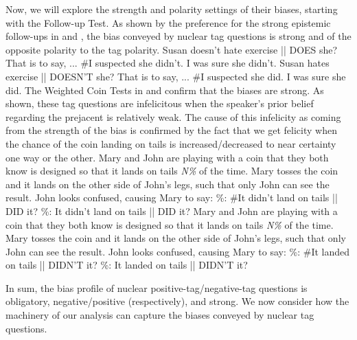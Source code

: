 \documentclass[output=paper,colorlinks,citecolor=brown]{langscibook}
\begin{document}
Now, we will explore the strength and polarity settings of their biases, starting with the Follow-up Test. As shown by the preference for the strong epistemic follow-ups in  and , the bias conveyed by nuclear tag questions is strong and of the opposite polarity to the tag polarity.
\is{}
\ea Susan doesn't hate exercise || DOES she? That is to say, ...\label{Pos.Nu.TIS}
    \ea \#I suspected she didn't.
    \ex I was sure she didn't.
    \z
\ex Susan hates exercise || DOESN'T she? That is to say, ...\label{Neg.Nu.TIS}
    \ea \#I suspected she did.
    \ex I was sure she did.
    \z
\z
{}
The Weighted Coin Tests in  and  confirm that the biases are strong. As shown, these tag questions are infelicitous when the speaker's prior belief regarding the prejacent is relatively weak. The cause of this infelicity as coming from the strength of the bias is confirmed by the fact that we get felicity when the chance of the coin landing on tails is increased/decreased to near certainty one way or the other.
\is{}
\ea Mary and John are playing with a coin that they both know is designed so that it lands on tails \textit{N\%} of the time. Mary tosses the coin and it lands on the other side of John's legs, such that only John can see the result. John looks confused, causing Mary to say:\label{Pos.Nu.WC}
    \%: \#It didn't land on tails || DID it?\label{Pos.Nu.WC.30}
    \%: It didn't land on tails || DID it?\label{Neg.Pnu.WC.1}
    \z
\ex Mary and John are playing with a coin that they both know is designed so that it lands on tails \textit{N\%} of the time. Mary tosses the coin and it lands on the other side of John's legs, such that only John can see the result. John looks confused, causing Mary to say:\label{Neg.Nu.WC}
    \%: \#It landed on tails || DIDN'T it?\label{Neg.Nu.WC.70}
    \%: It landed on tails || DIDN'T it?\label{Neg.Nu.WC.99}
    \z
\z
{}

In sum, the bias profile of nuclear positive-tag/negative-tag questions is obligatory, negative/positive (respectively), and strong. We now consider how the machinery of our analysis can capture the biases conveyed by nuclear tag questions. 
\end{document}

